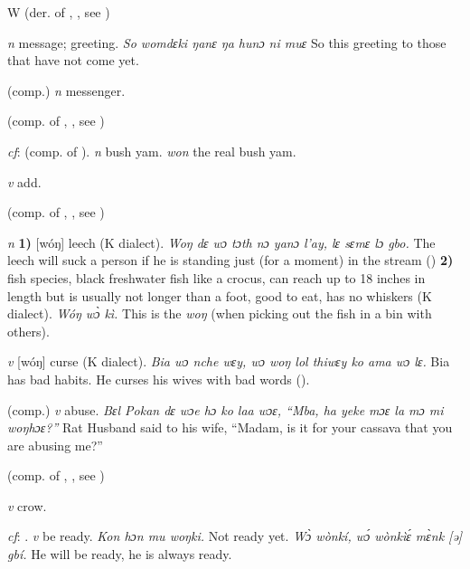 \begin{letter}{W}
 (der. of , , see ) 

 \textit{n} message; greeting. \textit{So womdɛki ŋanɛ ŋa hunɔ ni muɛ} So this greeting to those that have not come yet.

 (comp.) \textit{n} messenger.

 (comp. of , , see ) 

 \textit{cf}:  (comp. of ). \textit{n} bush yam. \textit{won} the real bush yam.

 \textit{v} add.

 (comp. of , , see ) 

 \textit{n} \textbf{1)} [wóŋ] leech (K dialect). \textit{Woŋ dɛ wɔ tɔth nɔ yanɔ l'ay, lɛ sɛmɛ lɔ gbo.} The leech will suck a person if he is standing just (for a moment) in the stream (\citealt{Pichl1967}) \textbf{2)} fish species, black freshwater fish like a crocus, can reach up to 18 inches in length but is usually not longer than a foot, good to eat, has no whiskers (K dialect). \textit{Wóŋ wɔ̀ kì.} This is the \textit{woŋ} (when picking out the fish in a bin with others). 

 \textit{v} [wóŋ] curse (K dialect). \textit{Bia wɔ nche wɛy, wɔ woŋ lol thiwɛy ko ama wɔ lɛ.} Bia has bad habits. He curses his wives with bad words (\citealt{Pichl1967}).

 (comp.) \textit{v} abuse. \textit{Bɛl Pokan dɛ wɔe hɔ ko laa wɔɛ, “Mba, ha yeke mɔɛ la mɔ mi woŋhɔɛ?”} Rat Husband said to his wife, “Madam, is it for your cassava that you are abusing me?”

 (comp. of , , see ) 

 \textit{v} crow.

 \textit{cf}: . \textit{v} be ready. \textit{Kon hɔn mu woŋki.} Not ready yet. \textit{Wɔ̀ wònkí, wɔ́ wònkìɛ́ mɛ̀nk [ə] gbí.} He will be ready, he is always ready.


\end{letter}
